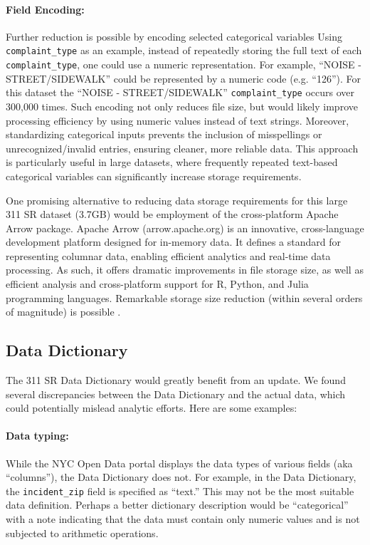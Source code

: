 \documentclass[linenumber]{jdsart}
\begin{document}
\paragraph{Field Encoding:} Further reduction is possible 
by encoding selected categorical variables 
Using \texttt{complaint\_type} as an example,
instead of repeatedly storing the full text of each \texttt{complaint\_type}, 
one could use a numeric representation. For example, 
``NOISE - STREET/SIDEWALK'' could be represented by a 
numeric code (e.g. ``126''). For this dataset the 
``NOISE - STREET/SIDEWALK'' \texttt{complaint\_type} occurs 
over 300,000 times. Such encoding not only reduces file 
size, but would likely improve processing efficiency by using numeric
values instead of text strings. Moreover, standardizing 
categorical inputs prevents the inclusion of misspellings 
or unrecognized/invalid entries, ensuring cleaner, more reliable 
data. This approach is particularly useful in large datasets, where 
frequently repeated text-based categorical variables can 
significantly increase storage requirements.


One promising alternative to reducing data storage requirements 
for this large 311 SR dataset (3.7GB) would be employment of 
the cross-platform Apache Arrow package. Apache Arrow (arrow.apache.org) 
is an innovative, cross-language development platform designed for 
in-memory data. It defines a standard for representing columnar data, 
enabling efficient analytics and real-time data processing. As such,
it offers dramatic improvements in file storage size, as well as 
efficient analysis and cross-platform support for R, Python, 
and Julia programming languages. Remarkable storage size 
reduction (within several orders of magnitude) is possible \citep{bates2024csv}.


\subsection{Data Dictionary} 
\label{sec:datadictionary}

The 311 SR Data Dictionary would greatly benefit from an update. We
found several discrepancies between the Data Dictionary and the actual
data, which could potentially mislead analytic efforts. Here are some
examples:


\paragraph{Data typing:} While the NYC Open Data portal displays the data types of 
various fields (aka ``columns''), the Data Dictionary does 
not. For example, in the Data Dictionary, 
the \texttt{incident\_zip} field is specified as ``text.'' This may 
not be the most suitable data definition. Perhaps a better 
dictionary description would be  ``categorical'' with a note 
indicating that the data must contain only numeric values 
and is not subjected to arithmetic operations.
\end{document}
